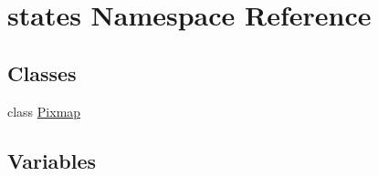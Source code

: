 \hypertarget{namespacestates}{}\section{states Namespace Reference}
\label{namespacestates}
\subsection*{Classes}
\begin{DoxyCompactItemize}
\item 
class \hyperlink{classstates_1_1Pixmap}{Pixmap}
\end{DoxyCompactItemize}
\subsection*{Variables}
